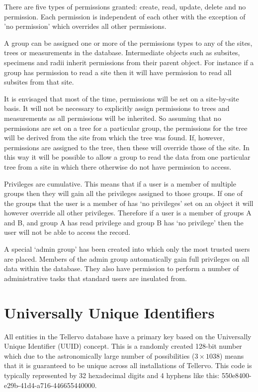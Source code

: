 There are five types of permissions granted: create, read, update, delete and no permission. Each permission is independent of each other with the exception of 'no permission' which overrides all other permissions.

A group can be assigned one or more of the permissions types to any of the sites, trees or measurements in the database. Intermediate objects such as subsites, specimens and radii inherit permissions from their parent object. For instance if a group has permission to read a site then it will have permission to read all subsites from that site.

It is envisaged that most of the time, permissions will be set on a site-by-site basis. It will not be necessary to explicitly assign permissions to trees and measurements as all permissions will be inherited. So assuming that no permissions are set on a tree for a particular group, the permissions for the tree will be derived from the site from which the tree was found. If, however, permissions are assigned to the tree, then these will override those of the site. In this way it will be possible to allow a group to read the data from one particular tree from a site in which there otherwise do not have permission to access.

Privileges are cumulative. This means that if a user is a member of multiple groups then they will gain all the privileges assigned to those groups. If one of the groups that the user is a member of has `no privileges' set on an object it will however override all other privileges. Therefore if a user is a member of groups A and B, and group A has read privilege and group B has `no privilege' then the user will not be able to access the record.

A special `admin group' has been created into which only the most trusted users are placed. Members of the admin group automatically gain full privileges on all data within the database. They also have permission to perform a number of administrative tasks that standard users are insulated from. 


\section{Universally Unique Identifiers}
\label{txt:uuid}
All entities in the Tellervo database have a primary key based on the Universally Unique Identifier (UUID) concept. This is a randomly created 128-bit number which due to the astronomically large number of possibilities ($3 \times 1038$) means that it is guaranteed to be unique across all installations of Tellervo. This code is typically represented by 32 hexadecimal digits and 4 hyphens like this: 550e8400-e29b-41d4-a716-446655440000.

